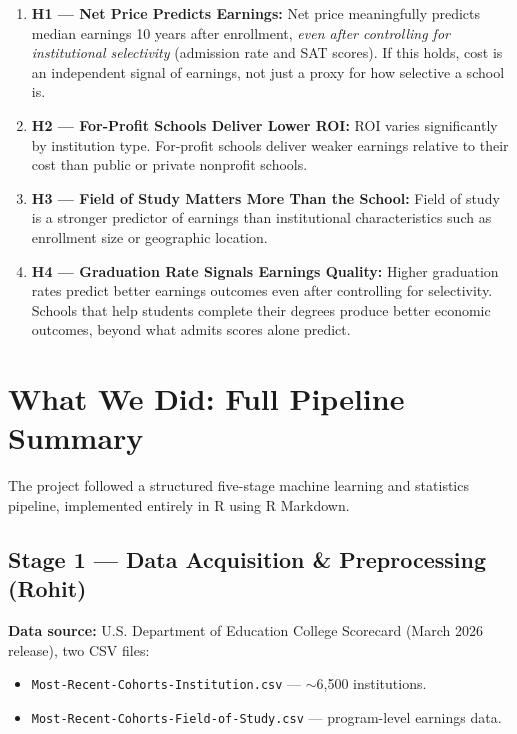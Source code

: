 \documentclass[12pt, letterpaper]{article}
\begin{document}
\begin{enumerate}
  \item \textbf{H1 — Net Price Predicts Earnings:}
    Net price meaningfully predicts median earnings 10 years after enrollment, \textit{even after controlling for institutional selectivity} (admission rate and SAT scores). If this holds, cost is an independent signal of earnings, not just a proxy for how selective a school is.

  \item \textbf{H2 — For-Profit Schools Deliver Lower ROI:}
    ROI varies significantly by institution type. For-profit schools deliver weaker earnings relative to their cost than public or private nonprofit schools.

  \item \textbf{H3 — Field of Study Matters More Than the School:}
    Field of study is a stronger predictor of earnings than institutional characteristics such as enrollment size or geographic location.

  \item \textbf{H4 — Graduation Rate Signals Earnings Quality:}
    Higher graduation rates predict better earnings outcomes even after controlling for selectivity. Schools that help students complete their degrees produce better economic outcomes, beyond what admits scores alone predict.
\end{enumerate}

\section{What We Did: Full Pipeline Summary}

The project followed a structured five-stage machine learning and statistics pipeline, implemented entirely in R using R Markdown.

\subsection{Stage 1 — Data Acquisition \& Preprocessing (Rohit)}

\textbf{Data source:} U.S. Department of Education College Scorecard (March 2026 release), two CSV files:
\begin{itemize}
  \item \texttt{Most-Recent-Cohorts-Institution.csv} — $\sim$6,500 institutions.
  \item \texttt{Most-Recent-Cohorts-Field-of-Study.csv} — program-level earnings data.
\end{itemize}
\end{document}
